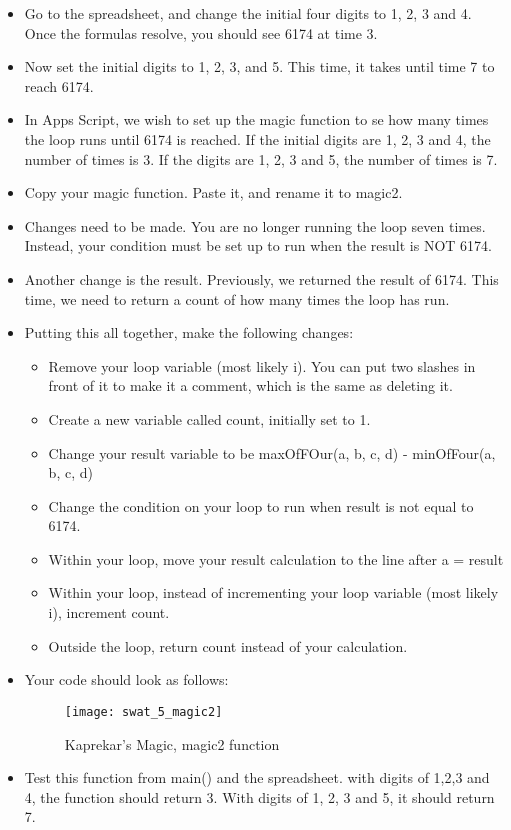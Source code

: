 \documentclass{article}
\begin{document}
\begin{itemize}
	\item Go to the spreadsheet, and change the initial four digits to 1, 2, 3 and 4.  Once the formulas resolve, you should see 6174 at time 3.
	\item Now set the initial digits to 1, 2, 3, and 5.  This time, it takes until time 7 to reach 6174.  
	\item In Apps Script, we wish to set up the magic function to se how many times the loop runs until 6174 is reached.  If the initial digits are 1, 2, 3 and 4, the number of times is 3.  If the digits are 1, 2, 3 and 5, the number of times is 7.
	\item Copy your magic function.  Paste it, and rename it to magic2.
	\item Changes need to be made.  You are no longer running the loop seven times.  Instead, your condition must be set up to run when the result is NOT 6174.
	\item Another change is the result.  Previously, we returned the result of 6174.  This time, we need to return a count of how many times the loop has run.
	\item Putting this all together, make the following changes:
	\begin{itemize}
		\item  Remove your loop variable (most likely i).  You can put two slashes in front of it to make it a comment, which is the same as deleting it.
		\item Create a new variable called count, initially set to 1.
		\item Change your result variable to be maxOfFOur(a, b, c, d) - minOfFour(a, b, c, d)
		\item Change the condition on your loop to run when result is not equal to 6174.
		\item Within your loop, move your result calculation to the line after a = result
		\item Within your loop, instead of incrementing your loop variable (most likely i), increment count.
		\item Outside the loop, return count instead of your calculation.
	\end{itemize} 
	\item Your code should look as follows:
	\begin{figure}[H]
  		\centering
  		\texttt{[image: swat\_5\_magic2]}
  		\caption{Kaprekar's Magic, magic2 function}
	\end{figure}
	\item Test this function from main() and the spreadsheet.  with digits of 1,2,3 and 4, the function should return 3.  With digits of 1, 2, 3 and 5, it should return 7.
\end{itemize}
\end{document}

